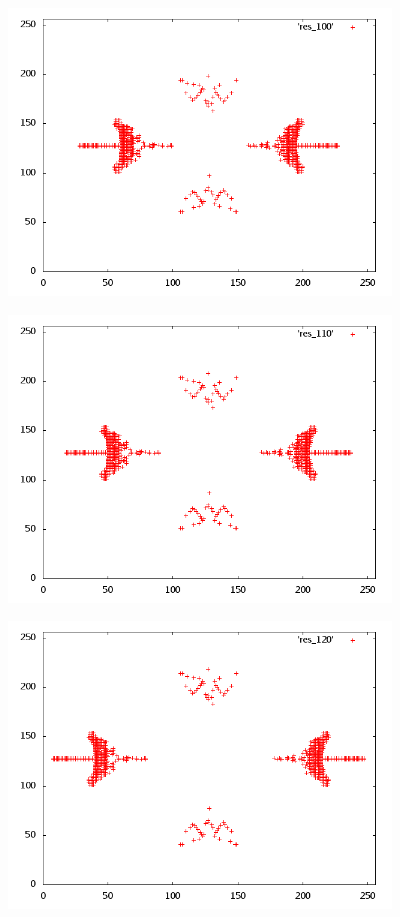 \begin{center}
\includegraphics[width=4in]{res_100.png}
\end{center}
\begin{center}
\includegraphics[width=4in]{res_110.png}
\end{center}
\begin{center}
\includegraphics[width=4in]{res_120.png}
\end{center}
